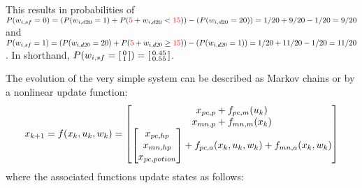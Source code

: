 \documentclass[9pt, onecolumn]{report}
\begin{document}
This results in probabilities of 
$P(w_{i,sf} = 0) = (P(w_{i,d20} = 1) + P({\color{red} 5} + w_{i,d20} < {\color{red} 15})) - (P(w_{i,d20} = 20)) = 1/20 + 9/20 - 1/20 = 9/20$ 
and 
$P(w_{i,sf} = 1) = (P(w_{i,d20} = 20) + P({\color{red} 5} + w_{i,d20} \geq {\color{red} 15})) - (P(w_{i,d20} = 1)) = 1/20 + 11/20 - 1/20 = 11/20$.
In shorthand, $P(w_{i,sf}=\smqty[0\\1]) = \smqty[0.45\\0.55]$.

The evolution of the very simple system can be described as Markov chains or by a nonlinear update function:\[
    x_{k+1} = f(x_k, u_k, w_k) 
    = \mqty[
        x_{pc,p} + f_{pc,m}(u_k)\\
        x_{mn,p} + f_{mn,m}(x_k)\\
        \mqty[x_{pc,hp}\\ x_{mn,hp} \\ x_{pc,potion}] + f_{pc,a}(x_k,u_k,w_k) + f_{mn,a}(x_k,w_k)
    ]
\] where the associated functions update states as follows: 
\end{document}
